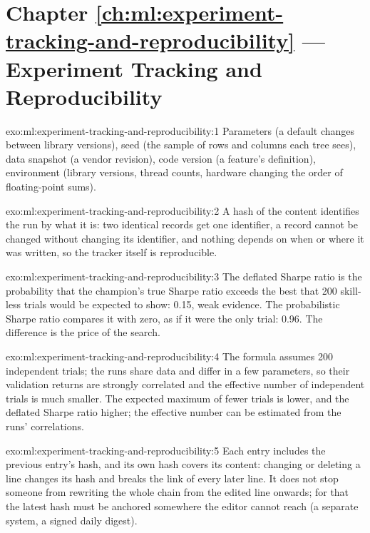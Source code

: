 \section*{Chapter \ref{ch:ml:experiment-tracking-and-reproducibility} --- Experiment Tracking and Reproducibility}

\begin{solution}{exo:ml:experiment-tracking-and-reproducibility:1}
Parameters (a default changes between library versions), seed (the sample of rows and columns each tree sees), data snapshot
(a vendor revision), code version (a feature's definition), environment (library versions, thread counts, hardware changing the
order of floating-point sums).
\end{solution}

\begin{solution}{exo:ml:experiment-tracking-and-reproducibility:2}
A hash of the content identifies the run by what it is: two identical records get one identifier, a record cannot be changed
without changing its identifier, and nothing depends on when or where it was written, so the tracker itself is reproducible.
\end{solution}

\begin{solution}{exo:ml:experiment-tracking-and-reproducibility:3}
The deflated Sharpe ratio is the probability that the champion's true Sharpe ratio exceeds the best that 200 skill-less trials
would be expected to show: 0.15, weak evidence. The probabilistic Sharpe ratio compares it with zero, as if it were the only
trial: 0.96. The difference is the price of the search.
\end{solution}

\begin{solution}{exo:ml:experiment-tracking-and-reproducibility:4}
The formula assumes 200 independent trials; the runs share data and differ in a few parameters, so their validation returns are
strongly correlated and the effective number of independent trials is much smaller. The expected maximum of fewer trials is
lower, and the deflated Sharpe ratio higher; the effective number can be estimated from the runs' correlations.
\end{solution}

\begin{solution}{exo:ml:experiment-tracking-and-reproducibility:5}
Each entry includes the previous entry's hash, and its own hash covers its content: changing or deleting a line changes its hash
and breaks the link of every later line. It does not stop someone from rewriting the whole chain from the edited line onwards; for
that the latest hash must be anchored somewhere the editor cannot reach (a separate system, a signed daily digest).
\end{solution}

